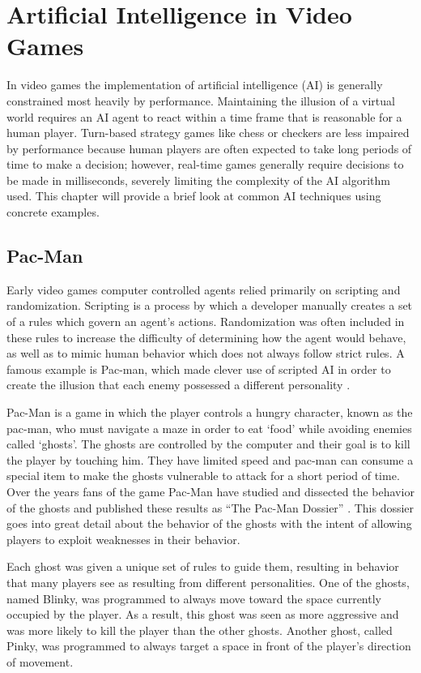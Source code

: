 \chapter{Artificial Intelligence in Video Games}

In video games the implementation of artificial intelligence (AI) is generally constrained most heavily by performance. Maintaining the illusion of a virtual world requires an AI agent to react within a time frame that is reasonable for a human player. Turn-based strategy games like chess or checkers are less impaired by performance because human players are often expected to take long periods of time to make a decision; however, real-time games generally require decisions to be made in milliseconds, severely limiting the complexity of the AI algorithm used. This chapter will provide a brief look at common AI techniques using concrete examples.

\section{Pac-Man}

Early video games computer controlled agents relied primarily on scripting and randomization. Scripting is a process by which a developer manually creates a set of a rules which govern an agent's actions. Randomization was often included in these rules to increase the difficulty of determining how the agent would behave, as well as to mimic human behavior which does not always follow strict rules. A famous example is Pac-man, which made clever use of scripted AI in order to create the illusion that each enemy possessed a different personality \cite{pacman}.

Pac-Man is a game in which the player controls a hungry character, known as the pac-man, who must navigate a maze in order to eat `food' while avoiding enemies called `ghosts'. The ghosts are controlled by the computer and their goal is to kill the player by touching him. They have limited speed and pac-man can consume a special item to make the ghosts vulnerable to attack for a short period of time. Over the years fans of the game Pac-Man have studied and dissected the behavior of the ghosts and published these results as ``The Pac-Man Dossier'' \cite{pacman}. This dossier goes into great detail about the behavior of the ghosts with the intent of allowing players to exploit weaknesses in their behavior.

Each ghost was given a unique set of rules to guide them, resulting in behavior that many players see as resulting from different personalities. One of the ghosts, named Blinky, was programmed to always move toward the space currently occupied by the player. As a result, this ghost was seen as more aggressive and was more likely to kill the player than the other ghosts. Another ghost, called Pinky, was programmed to always target a space in front of the player's direction of movement.

